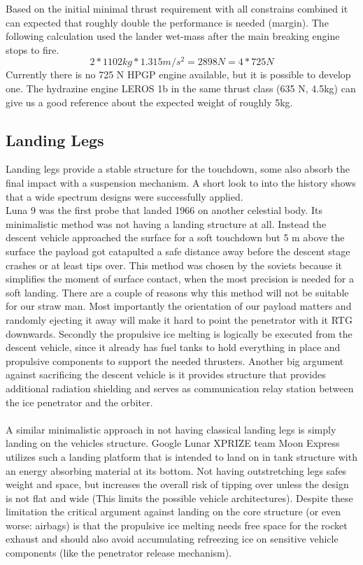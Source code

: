 Based on the initial minimal thrust requirement with all constrains combined it can expected that roughly double the performance is needed (margin). The following calculation used the lander wet-mass after the main breaking engine stops to fire.
$$2 * 1102 kg * 1.315 m/s^2 = 2898 N = 4 * 725 N$$
Currently there is no 725 N HPGP engine available, but it is possible to develop one. The hydrazine engine LEROS 1b in the same thrust class (635 N, 4.5kg) can give us a good reference about the expected weight of roughly 5kg.


\subsection{Landing Legs}
Landing legs provide a stable structure for the touchdown, some also absorb the final impact with a suspension mechanism. A short look to into the history shows that a wide spectrum designs were successfully applied.\\
 Luna 9 was the first probe that landed 1966 on another celestial body. Its minimalistic method was not having a landing structure at all. Instead the descent vehicle approached the surface for a soft touchdown but 5 m above the surface the payload got catapulted a safe distance away before the descent stage crashes or at least tips over. This method was chosen by the soviets because it simplifies the moment of surface contact, when the most precision is needed for a soft landing. There are a couple of reasons why this method will not be suitable for our straw man. Most importantly the orientation of our payload matters and randomly ejecting it away will make it hard to point the penetrator with it RTG downwards. Secondly the propulsive ice melting is logically be executed from the descent vehicle, since it already has fuel tanks to hold everything in place and propulsive components to support the needed thrusters.  Another big argument against sacrificing the descent vehicle is it provides structure that provides additional radiation shielding and serves as communication relay station between the ice penetrator and the orbiter.\\
\\
A similar minimalistic approach in not having classical landing legs is simply landing on the vehicles structure. Google Lunar XPRIZE team Moon Express utilizes such a landing platform that is intended to land on in tank structure with an energy absorbing material at its bottom. Not having outstretching legs safes weight and space, but increases the overall risk of tipping over unless the design is not flat and wide (This limits the possible vehicle architectures). Despite these limitation the critical argument against landing on the core structure (or even worse: airbags) is that the propulsive ice melting needs free space for the rocket exhaust and should also avoid accumulating refreezing ice on sensitive vehicle components (like the penetrator release mechanism).\\
